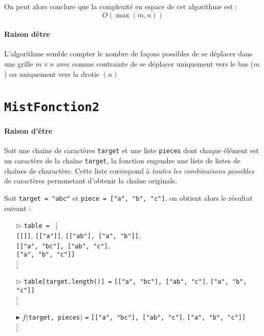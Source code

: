 \documentclass[9pt]{report}
\begin{document}
  On peut alors conclure que la complexité
  en espace de cet algorithme est : 
  \[ O(\max(m, n)) \]


  \paragraph{Raison dêtre}
  L'algorithme semble compter le nombre de façons possibles de se déplacer 
  dans une grille $m \times n$ avec comme contrainte de se déplacer uniquement 
  vers le bas ($m$) ou uniquement vers la drotie $(n)$
  \section{\texttt{MistFonction2}} 
  \paragraph{Raison d'être}
  Soit une chaine de caractères \texttt{target} et une liste 
  \texttt{pieces} dont chaque élément est un caractère de  
  la chaîne \texttt{target}, la fonction engendre une 
  liste de listes de chaînes de charactère. Cette liste correspond 
  à \textit{toutes les combinaisons possibles} de caractères permmetant 
  d'obtenir la chaîne originale. 

  \begin{EExample}{}{}
    Soit \texttt{target = "abc"} et \texttt{piece = ["a", "b", "c"]}, on obtient 
    alors le résultat suivant : 
    \begin{itemize}
      \item [$\rhd$] \texttt{table = } \textcolor{red}{[}
        \\ \texttt{\textcolor{myb}{[}[]\textcolor{myb}{]}}, 
        \texttt{\textcolor{myb}{[}["a"]\textcolor{myb}{]}}, 
        \texttt{\textcolor{myb}{[}["ab"], ["a", "b"]\textcolor{myb}{]}}, \\
        \texttt{\textcolor{myb}{[}["a", "bc"], ["ab", "c"]}, \\ 
        \texttt{["a", "b", "c"]\textcolor{myb}{]}} \\
        \textcolor{red}{]}
      \item [$\rhd$] \texttt{table[target.length()] =}  
        \texttt{\textcolor{myb}{[}["a", "bc"], ["ab", "c"]},  
        \texttt{["a", "b", "c"]\textcolor{myb}{]}} \\
        \textcolor{red}{]}
      \item[$\blacktriangleright$] $f($\texttt{target, pieces}$)$ \texttt{=} 
        \texttt{\textcolor{myb}{[}["a", "bc"], ["ab", "c"]},  
        \texttt{["a", "b", "c"]\textcolor{myb}{]}} \\
        \textcolor{red}{]}


 
    \end{itemize}
     
  \end{EExample}
\end{document}
